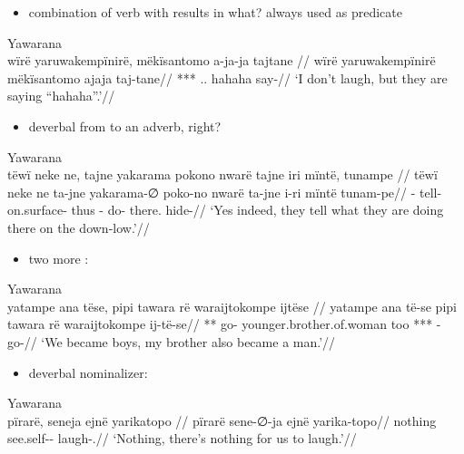 \documentclass{memoir}
\begin{document}
\begin{itemize}
\tightlist
\item
  combination of verb with  results in what? always used
  as predicate
\end{itemize}

\ex Yawarana \\
\label{convrisamaj-07}    \begingl
    \glpreamble  wïrë yaruwakempïnirë, mëkïsantomo a-ja-ja tajtane //
    \gla wïrë yaruwakempïnirë mëkïsantomo ajaja taj-tane//
    \glb {} *** .. hahaha say-//
        \glft ‘I don’t laugh, but they are saying “hahaha”.’//  
    \endgl 
\xe

\begin{itemize}
\tightlist
\item
  deverbal from  to an adverb, right?
\end{itemize}

\ex Yawarana \\
\label{convrisamaj-09}    \begingl
    \glpreamble  tëwï neke ne, tajne yakarama pokono nwarë tajne iri mïntë, tunampe //
    \gla tëwï neke ne ta-jne yakarama-∅ poko-no nwarë ta-jne i-ri mïntë tunam-pe//
    \glb {}   - tell- on.surface- thus - do- there. hide-//
        \glft ‘Yes indeed, they tell what they are doing there on the down-low.’//  
    \endgl 
\xe

\begin{itemize}
\tightlist
\item
  two more :
\end{itemize}

\ex Yawarana \\
\label{anfoperso-40}    \begingl
    \glpreamble  yatampe ana tëse, pipi tawara rë waraijtokompe ijtëse //
    \gla yatampe ana të-se pipi tawara rë waraijtokompe ij-të-se//
    \glb ***  go- younger.brother.of.woman too  *** -go-//
        \glft ‘We became boys, my brother also became a man.’//  
    \endgl 
\xe

\begin{itemize}
\tightlist
\item
  deverbal nominalizer:
\end{itemize}

\ex Yawarana \\
\label{convrisamaj-13}    \begingl
    \glpreamble  pïrarë, seneja ejnë yarikatopo //
    \gla pïrarë sene-∅-ja ejnë yarika-topo//
    \glb nothing see.self--  laugh-.//
        \glft ‘Nothing, there’s nothing for us to laugh.’//  
    \endgl 
\xe
\end{document}
